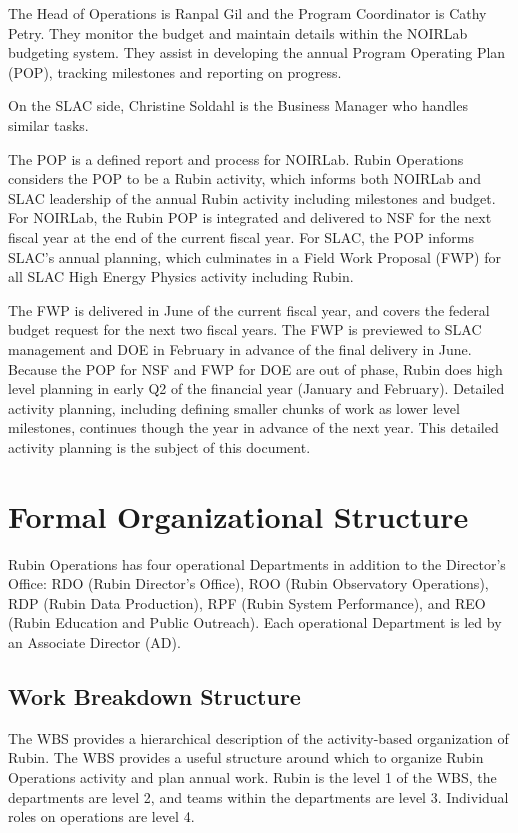 The Head of Operations is Ranpal Gil and the Program Coordinator is Cathy Petry.
They monitor the budget and maintain details within the NOIRLab budgeting system.
They assist in developing the annual Program Operating Plan (POP), tracking milestones and reporting on progress.

On the SLAC side, Christine Soldahl is the Business Manager who handles similar tasks.

The POP is a defined report and process for NOIRLab.
Rubin Operations considers the POP to be a Rubin activity, which informs both NOIRLab and SLAC leadership of the annual Rubin activity including milestones and budget.
For NOIRLab, the Rubin POP is integrated and delivered to NSF for the next fiscal year at the end of the current fiscal year.
For SLAC, the POP informs SLAC's annual planning, which culminates in a Field Work Proposal (FWP) for all SLAC High Energy Physics activity including Rubin.

The FWP is delivered in June of the current fiscal year, and covers the federal budget request for the next two fiscal years.
The FWP is previewed to SLAC management and DOE in February in advance of the final delivery in June.
Because the POP for NSF and FWP for DOE are out of phase, Rubin does high level planning in early Q2 of the financial year (January and February).
Detailed activity planning, including defining smaller chunks of work as lower level milestones, continues though the year in advance of the next year.
This detailed activity planning is the subject of this document.

\section{Formal Organizational Structure}
\label{sec:structure}

Rubin Operations has four operational Departments in addition to the Director’s Office: RDO (Rubin Director’s Office), ROO (Rubin Observatory Operations), RDP (Rubin Data Production), RPF (Rubin System Performance), and REO (Rubin Education and Public Outreach).
Each operational Department is led by an Associate Director (AD).

\subsection{Work Breakdown Structure}
\label{sec:wbs}

The \gls{WBS} provides a hierarchical description of the activity-based organization of Rubin.
The WBS provides a useful structure around which to organize Rubin Operations activity and plan annual work.
Rubin is the level 1 of the WBS, the departments are level 2, and teams within the departments are level 3.
Individual roles on operations are level 4.

